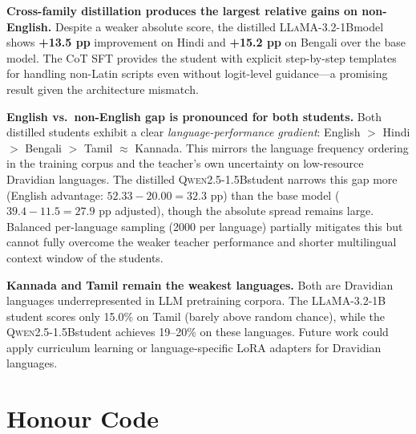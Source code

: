 \documentclass[11pt,a4paper]{article}
\newcommand{\qwen}{\textsc{Qwen2.5-1.5B}}
\newcommand{\llama}{\textsc{LLaMA-3.2-1B}}
\begin{document}
\textbf{Cross-family distillation produces the largest relative gains on non-English.}
Despite a weaker absolute score, the distilled \llama model shows \textbf{+13.5 pp}
improvement on Hindi and \textbf{+15.2 pp} on Bengali over the base model.  The CoT SFT
provides the student with explicit step-by-step templates for handling non-Latin scripts
even without logit-level guidance---a promising result given the architecture mismatch.

\textbf{English vs.\ non-English gap is pronounced for both students.}
Both distilled students exhibit a clear \emph{language-performance gradient}: English
$>$ Hindi $>$ Bengali $>$ Tamil $\approx$ Kannada.  This mirrors the language frequency
ordering in the training corpus and the teacher's own uncertainty on low-resource
Dravidian languages.  The distilled \qwen student narrows this gap more (English advantage:
$52.33 - 20.00 = 32.3$ pp) than the base model ($39.4 - 11.5 = 27.9$ pp adjusted), though
the absolute spread remains large.  Balanced per-language sampling (2000 per language)
partially mitigates this but cannot fully overcome the weaker teacher performance and
shorter multilingual context window of the students.

\textbf{Kannada and Tamil remain the weakest languages.}
Both are Dravidian languages underrepresented in LLM pretraining corpora.  The \llama
student scores only 15.0\% on Tamil (barely above random chance), while the \qwen student
achieves 19--20\% on these languages.  Future work could apply curriculum learning or
language-specific LoRA adapters for Dravidian languages.

\section*{Honour Code}

\begin{center}
\end{center}
\end{document}

